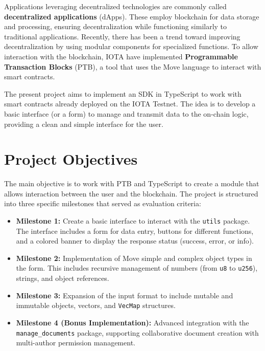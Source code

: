 \documentclass[12pt,a4paper]{article}
\begin{document}
Applications leveraging decentralized technologies are commonly called \textbf{decentralized applications} (dApps). These employ blockchain for data storage and processing, ensuring decentralization while functioning similarly to traditional applications. Recently, there has been a trend toward improving decentralization by using modular components for specialized functions. To allow interaction with the blockchain, IOTA have implemented \textbf{Programmable Transaction Blocks} (PTB), a tool that uses the Move language to interact with smart contracts.

The present project aims to implement an SDK in TypeScript to work with smart contracts already deployed on the IOTA Testnet. The idea is to develop a basic interface (or a form) to manage and transmit data to the on-chain logic, providing a clean and simple interface for the user.

\section{Project Objectives}

The main objective is to work with PTB and TypeScript to create a module that allows interaction between the user and the blockchain. The project is structured into three specific milestones that served as evaluation criteria:

\begin{itemize}
    \item \textbf{Milestone 1:} Create a basic interface to interact with the \texttt{utils} package. The interface includes a form for data entry, buttons for different functions, and a colored banner to display the response status (success, error, or info).
    \item \textbf{Milestone 2:} Implementation of Move simple and complex object types in the form. This includes recursive management of numbers (from \texttt{u8} to \texttt{u256}), strings, and object references.
    \item \textbf{Milestone 3:} Expansion of the input format to include mutable and immutable objects, vectors, and \texttt{VecMap} structures.
    \item \textbf{Milestone 4 (Bonus Implementation):} Advanced integration with the \texttt{manage\_documents} package, supporting collaborative document creation with multi-author permission management.
\end{itemize}
\end{document}
